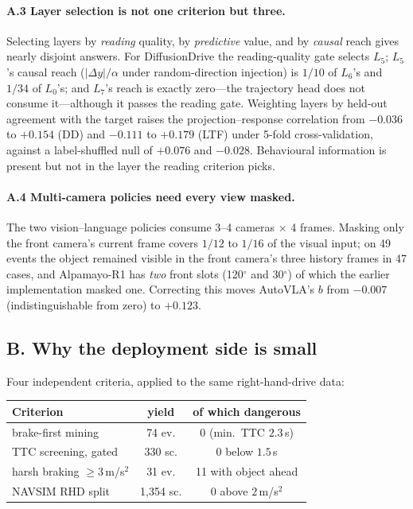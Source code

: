 \paragraph{A.3 Layer selection is not one criterion but three.}
Selecting layers by \emph{reading} quality, by \emph{predictive} value, and by \emph{causal}
reach gives nearly disjoint answers. For DiffusionDrive the reading-quality gate selects $L_5$;
$L_5$'s causal reach ($|\Delta y|/\alpha$ under random-direction injection) is $1/10$ of $L_6$'s
and $1/34$ of $L_0$'s; and $L_7$'s reach is exactly zero---the trajectory head does not consume
it---although it passes the reading gate. Weighting layers by held-out agreement with the target
raises the projection--response correlation from $-0.036$ to $+0.154$ (DD) and $-0.111$ to
$+0.179$ (LTF) under 5-fold cross-validation, against a label-shuffled null of $+0.076$ and
$-0.028$. Behavioural information is present but not in the layer the reading criterion picks.

\paragraph{A.4 Multi-camera policies need every view masked.}
The two vision--language policies consume 3--4 cameras $\times$ 4 frames. Masking only the
front camera's current frame covers $1/12$ to $1/16$ of the visual input; on 49 events the
object remained visible in the front camera's three history frames in 47 cases, and
Alpamayo-R1 has \emph{two} front slots (120$^\circ$ and 30$^\circ$) of which the earlier
implementation masked one. Correcting this moves AutoVLA's $b$ from $-0.007$ (indistinguishable
from zero) to $+0.123$.

\subsection*{B. Why the deployment side is small}

Four independent criteria, applied to the same right-hand-drive data:

\begin{center}\footnotesize
\setlength{\tabcolsep}{4pt}
\begin{tabular}{@{}lcc@{}}
\toprule
Criterion & yield & of which dangerous \\
\midrule
brake-first mining              & 74 ev. & 0 (min.\ TTC $2.3$\,s) \\
TTC screening, gated            & 330 sc. & 0 below $1.5$\,s \\
harsh braking $\ge 3$\,m/s$^2$  & 31 ev. & 11 with object ahead \\
NAVSIM RHD split                & 1{,}354 sc. & 0 above $2$\,m/s$^2$ \\
\bottomrule
\end{tabular}
\end{center}

